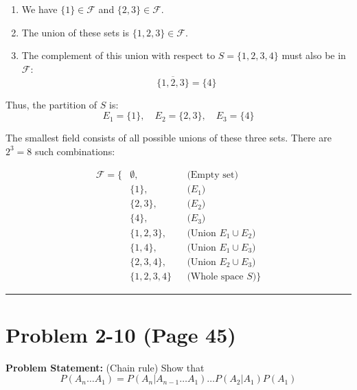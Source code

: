 \documentclass{article}
\begin{document}
\begin{enumerate}
	\item We have $\{1\} \in \mathcal{F}$ and $\{2, 3\} \in \mathcal{F}$.
	\item The union of these sets is $\{1, 2, 3\} \in \mathcal{F}$.
	\item The complement of this union with respect to $S = \{1, 2, 3, 4\}$ must also be in $\mathcal{F}$:
	      \[ \overline{\{1, 2, 3\}} = \{4\} \]
\end{enumerate}

Thus, the partition of $S$ is:
\[ E_1 = \{1\}, \quad E_2 = \{2, 3\}, \quad E_3 = \{4\} \]

The smallest field consists of all possible unions of these three sets. There are $2^3 = 8$ such combinations:

\begin{align*}
	\mathcal{F} = \Big\{
	 & \emptyset,     &  & \text{(Empty set)}           \\
	 & \{1\},         &  & \text{(} E_1)                \\
	 & \{2, 3\},      &  & \text{(} E_2)                \\
	 & \{4\},         &  & \text{(} E_3)                \\
	 & \{1, 2, 3\},   &  & \text{(Union } E_1 \cup E_2) \\
	 & \{1, 4\},      &  & \text{(Union } E_1 \cup E_3) \\
	 & \{2, 3, 4\},   &  & \text{(Union } E_2 \cup E_3) \\
	 & \{1, 2, 3, 4\} &  & \text{(Whole space } S)
	\Big\}
\end{align*}

\vspace{1cm}
\hrule
\vspace{1cm}

\section*{Problem 2-10 (Page 45)}
\textbf{Problem Statement:} (Chain rule) Show that
\[ P(A_n \dots A_1) = P(A_n | A_{n-1} \dots A_1) \dots P(A_2 | A_1) P(A_1) \]
\end{document}
